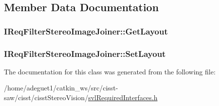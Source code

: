 \subsection{Member Data Documentation}
\hypertarget{class_i_req_filter_stereo_image_joiner_a39c729d4120ae4e0cc05b58d9e478812}{
\subsubsection[{Get\-Layout}]{ I\-Req\-Filter\-Stereo\-Image\-Joiner\-::\-Get\-Layout}}\label{class_i_req_filter_stereo_image_joiner_a39c729d4120ae4e0cc05b58d9e478812}
\hypertarget{class_i_req_filter_stereo_image_joiner_a5e2f7bb1b492d0001721ae8dea1348b7}{
\subsubsection[{Set\-Layout}]{ I\-Req\-Filter\-Stereo\-Image\-Joiner\-::\-Set\-Layout}}\label{class_i_req_filter_stereo_image_joiner_a5e2f7bb1b492d0001721ae8dea1348b7}


The documentation for this class was generated from the following file\-:\begin{DoxyCompactItemize}
\item 
/home/adeguet1/catkin\-\_\-ws/src/cisst-\/saw/cisst/cisst\-Stereo\-Vision/\hyperlink{svl_required_interfaces_8h}{svl\-Required\-Interfaces.\-h}\end{DoxyCompactItemize}
